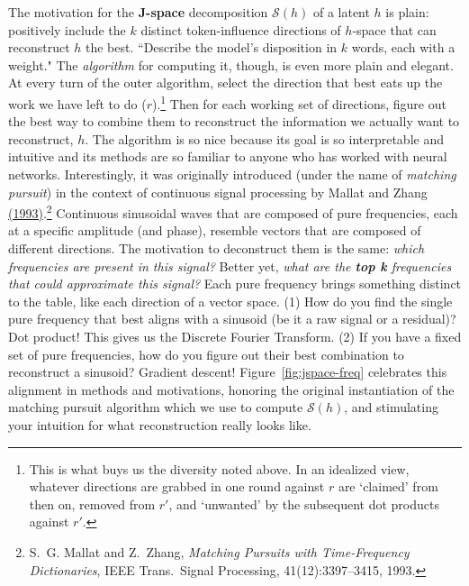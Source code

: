 \documentclass{article}
\newcommand{\jspace}{\mathscr{S}}
\begin{document}
The motivation for the \textbf{J-space} decomposition \(\jspace(h)\) of a latent \(h\) is plain: positively include the \(k\) distinct token-influence directions of \(h\)-space that can reconstruct \(h\) the best. ``Describe the model's disposition in \(k\) words, each with a weight." The \textit{algorithm} for computing it, though, is even more plain and elegant. At every turn of the outer algorithm, select the direction that best eats up the work we have left to do (\(r\)).\footnote{This is what buys us the diversity noted above. In an idealized view, whatever directions are grabbed in one round against \(r\) are `claimed' from then on, removed from \(r'\), and `unwanted' by the subsequent dot products against \(r'\).} Then for each working set of directions, figure out the best way to combine them to reconstruct the information we actually want to reconstruct, \(h\). The algorithm is so nice because its goal is so interpretable and intuitive and its methods are so familiar to anyone who has worked with neural networks. Interestingly, it was originally introduced (under the name of \textit{matching pursuit}) in the context of continuous signal processing by Mallat and Zhang \href{https://doi.org/10.1109/78.258082}{(1993)}.\footnote{S.~G. Mallat and Z.~Zhang, \textit{Matching Pursuits with Time-Frequency Dictionaries}, IEEE Trans.\ Signal Processing, 41(12):3397--3415, 1993.} Continuous sinusoidal waves that are composed of pure frequencies, each at a specific amplitude (and phase), resemble vectors that are composed of different directions. The motivation to deconstruct them is the same: \textit{which frequencies are present in this signal?} Better yet, \textit{what are the \textbf{top k }frequencies that could approximate this signal?} Each pure frequency brings something distinct to the table, like each direction of a vector space. (1) How do you find the single pure frequency that best aligns with a sinusoid (be it a raw signal or a residual)? Dot product! This gives us the Discrete Fourier Transform. (2) If you have a fixed set of pure frequencies, how do you figure out their best combination to reconstruct a sinusoid? Gradient descent!  Figure~\ref{fig:jspace-freq} celebrates this alignment in methods and motivations, honoring the original instantiation of the matching pursuit algorithm which we use to compute \(\jspace(h)\), and stimulating your intuition for what reconstruction really looks like. 
\end{document}
